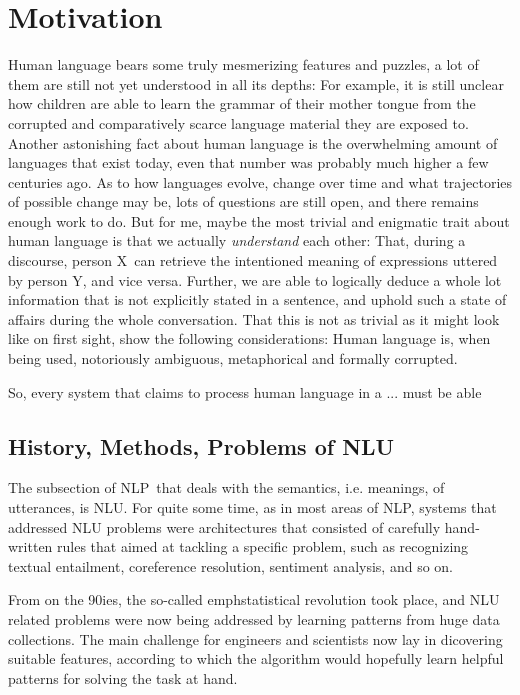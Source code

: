 
\label{chap:1_intro}
\section{Motivation}

Human language bears some truly mesmerizing features and puzzles, a lot of them are still not yet 
understood in all its depths:
For example, it is still unclear how children are able to learn the grammar of their mother tongue 
from the corrupted and comparatively scarce language material they are exposed to. %
Another astonishing fact about human language is the overwhelming amount of languages that
exist today, even that number was probably much higher a few centuries ago. 
As to how languages evolve, change over time and what trajectories of possible change may be,
lots of questions are still open, and there remains enough work to do.
But for me, maybe the most trivial and enigmatic trait about human language is that we actually
\emph{understand} each other:
That, during a discourse, person X can retrieve the intentioned meaning of expressions uttered by
person Y, and vice versa.
Further, we are able to logically deduce a whole lot information that is not explicitly stated
in a sentence, and uphold such a state of affairs during the whole conversation.
That this is not as trivial as it might look like on first sight, show the following considerations:
Human language is, when being used, notoriously ambiguous, metaphorical and formally corrupted.

So, every system that claims to process human language in a ... must be able 

\subsection{History, Methods, Problems of NLU}

The subsection of NLP that deals with the semantics, i.e. meanings, of utterances, is NLU.
For quite some time, as in most areas of NLP, systems that addressed NLU problems were architectures
that consisted of carefully hand-written rules that aimed at tackling a specific problem, such as
recognizing textual entailment, coreference resolution, sentiment analysis, and so on.

From on the 90ies, the so-called emph{statistical revolution} took place, and NLU related problems
were now being addressed by learning patterns from huge data collections.
The main challenge for engineers and scientists now lay in dicovering suitable features, according
to which the algorithm would hopefully learn helpful patterns for solving the task at hand.

